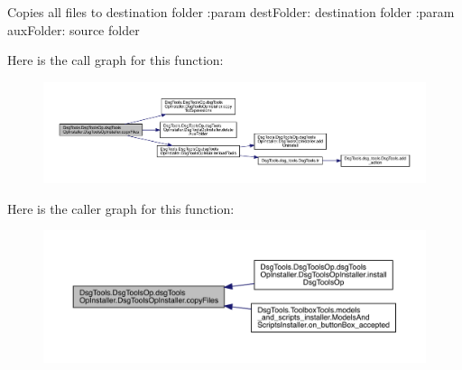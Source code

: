 \begin{DoxyVerb}Copies all files to destination folder
:param destFolder: destination folder
:param auxFolder: source folder
\end{DoxyVerb}
 Here is the call graph for this function\+:
\nopagebreak
\begin{figure}[H]
\begin{center}
\leavevmode
\includegraphics[width=350pt]{class_dsg_tools_1_1_dsg_tools_op_1_1dsg_tools_op_installer_1_1_dsg_tools_op_installer_a4f12609f9da8378c78343ec74dfdb682_cgraph}
\end{center}
\end{figure}
Here is the caller graph for this function\+:
\nopagebreak
\begin{figure}[H]
\begin{center}
\leavevmode
\includegraphics[width=350pt]{class_dsg_tools_1_1_dsg_tools_op_1_1dsg_tools_op_installer_1_1_dsg_tools_op_installer_a4f12609f9da8378c78343ec74dfdb682_icgraph}
\end{center}
\end{figure}
\mbox{\label{class_dsg_tools_1_1_dsg_tools_op_1_1dsg_tools_op_installer_1_1_dsg_tools_op_installer_a71b1b13badaea73c9c90f631fad8ba36}} 
